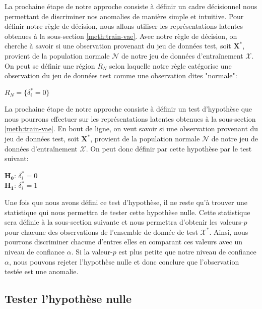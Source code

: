 La prochaine étape de notre approche consiste à définir un cadre décisionnel nous permettant de discriminer nos anomalies de manière simple et intuitive. Pour définir notre règle de décision, nous allons utiliser les représentations latentes obtenues à la sous-section \ref{meth:train-vae}. Avec notre règle de décision, on cherche à savoir si une observation provenant du jeu de données test, soit $\boldsymbol{X}^{*}$, provient de la population normale $\mathcal{N}$ de notre jeu de données d'entraînement $\mathcal{X}$. On peut se définir une région $R_{N}$ selon laquelle notre règle catégorise une observation du jeu de données test comme une observation dites "normale":

\begin{center}
	$R_{N} = \Big\{\delta^{*}_{i} = 0\Big\}$
\end{center}



La prochaine étape de notre approche consiste à définir un test d'hypothèse que nous pourrons effectuer sur les représentations latentes obtenues à la sous-section \ref{meth:train-vae}. En bout de ligne, on veut savoir si une observation provenant du jeu de données test, soit $\boldsymbol{X}^{*}$, provient de la population normale $\mathcal{N}$ de notre jeu de données d'entraînement $\mathcal{X}$. On peut donc définir par cette hypothèse par le test suivant:

\begin{center}
	$\boldsymbol{H_0}$: $\delta^{*}_{i} = 0$ \\
	$\boldsymbol{H_1}$: $\delta^{*}_{i} = 1$
\end{center}

Une fois que nous avons défini ce test d'hypothèse, il ne reste qu'à trouver une statistique qui nous permettra de tester cette hypothèse nulle. Cette statistique sera définie à la sous-section suivante et nous permettra d'obtenir les valeurs-$p$ pour chacune des observations de l'ensemble de donnée de test $\mathcal{X^{*}}$. Ainsi, nous pourrons discriminer chacune d'entres elles en comparant ces valeurs avec un niveau de confiance $\alpha$. Si la valeur-$p$ est plus petite que notre niveau de confiance $\alpha$, nous pouvons rejeter l'hypothèse nulle et donc conclure que l'observation testée est une anomalie.
 
\subsection{Tester l'hypothèse nulle} \label{metho:stats}

